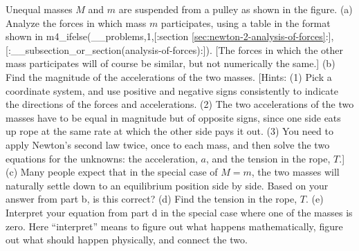 Unequal masses $M$ and $m$ are suspended from a pulley
as shown in the figure.\hwendpart
(a) Analyze the forces in which mass $m$ participates, using
a table in the format shown in m4_ifelse(__problems,1,[:section \ref{sec:newton-2-analysis-of-forces}:],[:__subsection_or_section(analysis-of-forces):]). [The forces in
which the other mass participates will of course be similar,
but not numerically the same.]\hwendpart
(b) Find the magnitude of the accelerations of the two
masses. [Hints: (1) Pick a coordinate system, and use
positive and negative signs consistently to indicate the
directions of the forces and accelerations. (2) The two
accelerations of the two masses have to be equal in
magnitude but of opposite signs, since one side eats up rope
at the same rate at which the other side pays it out. (3)
You need to apply Newton's second law twice, once to each
mass, and then solve the two equations for the unknowns: the
acceleration, $a$, and the tension in the rope, $T$.] \answercheck\hwendpart
(c) Many people expect that in the special case of $M=m$,
the two masses will naturally settle down to an equilibrium
position side by side. Based on your answer from part b,
is this correct? \hwendpart
(d) Find the tension in the rope, $T$.\answercheck\hwendpart
(e) Interpret your equation from part d in the special case where
one of the masses is zero. Here ``interpret'' means to figure out
what happens mathematically, figure out what should happen
physically, and connect the two.\hwendpart
